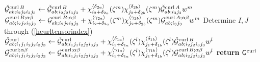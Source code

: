 \begin{algorithm}[ht!]
\begin{algorithmic}
                    \EndFor
                \EndFor
                                    \State$\check{\mathcal{G}}_{ab;i_2j_2i_3j_3}^{\operatorname{curl} B}\gets \check{\mathcal{G}}_{ab;i_2j_2i_3j_3}^{\operatorname{curl} B} + \chi_{i_2+\delta_{2a}}^{\langle\delta_{2a}\rangle}(\zeta^m) \chi_{j_2+\delta_{2b}}^{\langle\delta_{2b}\rangle}(\zeta^m) \check{\mathcal{G}}_{ab;i_3j_3}^{\operatorname{curl} A} w^m$
                                    \State$\mathcal{G}_{ab;i_2j_2i_3j_3}^{\operatorname{curl} B;\alpha \beta}\gets \mathcal{G}_{ab;i_2j_2i_3j_3}^{\operatorname{curl} B;\alpha \beta} + \chi_{i_2+\delta_{2a}}^{\langle\gamma_{2a}\rangle}(\zeta^m) \chi_{j_2+\delta_{2b}}^{\langle\gamma_{2b}\rangle}(\zeta^m) \mathcal{G}_{ab;i_3j_3}^{\operatorname{curl} A;\alpha \beta} w^m$ \Comment{(\ref{GB_hcurl1})}
                                    \EndFor
                                \EndIf
                        \EndFor       
                \EndFor
            \EndFor            
                            \State Determine $I,J$ through (\ref{hcurltensorindex})
                                            \State$\check{\mathcal{G}}_{ab;i_1j_1i_2j_2i_3j_3}^{\operatorname{curl}}\gets \check{\mathcal{G}}_{ab;i_1j_1i_2j_2i_3j_3}^{\operatorname{curl}} + \chi_{i_1+\delta_{1a}}^{\langle\delta_{1a}\rangle}(\zeta^l) \chi_{j_1+\delta_{1b}}^{\langle\delta_{1b}\rangle}(\zeta^l) \check{\mathcal{G}}_{ab;i_2j_2i_3j_3}^{\operatorname{curl} B} w^l$
                                            \State$\mathcal{G}_{ab;i_1j_1i_2j_2i_3j_3}^{\operatorname{curl};\alpha \beta}\gets \mathcal{G}_{ab;i_1j_1i_2j_2i_3j_3}^{\operatorname{curl};\alpha \beta} + \chi_{i_1+\delta_{1a}}^{\langle\gamma_{1a}\rangle}(\zeta^l) \chi_{j_1+\delta_{1b}}^{\langle\gamma_{1b}\rangle}(\zeta^l) \mathcal{G}_{ab;i_2j_2i_3j_3}^{\operatorname{curl} B;\alpha \beta} w^l$                                             
                                            \EndFor
                                        \EndIf
                                \EndFor
                            \EndIf
                    \EndFor
            \EndFor
    \EndFor
\EndFor
\State \textbf{return} $\mathsf{G}^{\operatorname{curl}}$
\EndProcedure
\end{algorithmic}
\end{algorithm}

